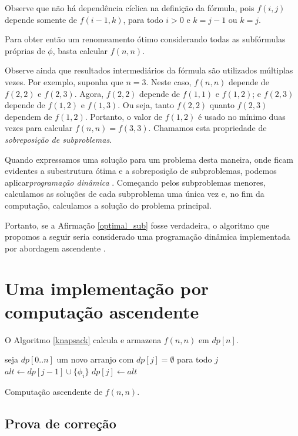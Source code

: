 Observe que não há dependência cíclica na definição da fórmula, pois $f(i,j)$ depende somente de $f(i-1,k)$, para todo $i > 0$ e $k=j-1$ ou $k=j$.

Para obter então um renomeamento ótimo considerando todas as subfórmulas próprias de $\phi$, basta calcular $f(n,n)$.

Observe ainda que resultados intermediários da fórmula são utilizados múltiplas vezes. Por exemplo, suponha que $n = 3$. Neste caso, $f(n,n)$ depende de $f(2,2)$ e $f(2,3)$. Agora, $f(2,2)$ depende de $f(1,1)$ e $f(1,2)$; e $f(2,3)$ depende de $f(1,2)$ e $f(1,3)$. Ou seja, tanto $f(2,2)$ quanto $f(2,3)$ dependem de $f(1,2)$. Portanto, o valor de $f(1,2)$ é usado no mínimo duas vezes para calcular $f(n,n) = f(3,3)$. Chamamos esta propriedade de \emph{sobreposição de subproblemas}.

Quando expressamos uma solução para um problema desta maneira, onde ficam evidentes a subestrutura ótima e a sobreposição de subproblemas, podemos aplicar\break \emph{programação dinâmica} \cite{bellman2015applied}. Começando pelos subproblemas menores, calculamos as soluções de cada subproblema uma única vez e, no fim da computação, calculamos a solução do problema principal.

Portanto, se a Afirmação \ref{optimal_sub} fosse verdadeira, o algoritmo que propomos a seguir seria considerado uma programação dinâmica implementada por abordagem ascendente \cite{bellman2015applied}.

\section{Uma implementação por computação ascendente}

\indent

O Algoritmo \ref{knapsack} calcula e armazena $f(n,n)$ em $dp[n]$.

\begin{algorithm}
	\begin{algorithmic}[1]
		\State seja $dp[0..n]$ um novo arranjo com $dp[j] = \emptyset$ para todo $j$
				\State $alt \gets dp[j-1] \cup \{\phi_i\}$
					\State $dp[j] \gets alt$
				\EndIf
			\EndFor
		\EndFor
	\end{algorithmic}
	\caption{Computação ascendente de $f(n,n)$.}
	\label{knapsack}
\end{algorithm}

\subsection{Prova de correção}

